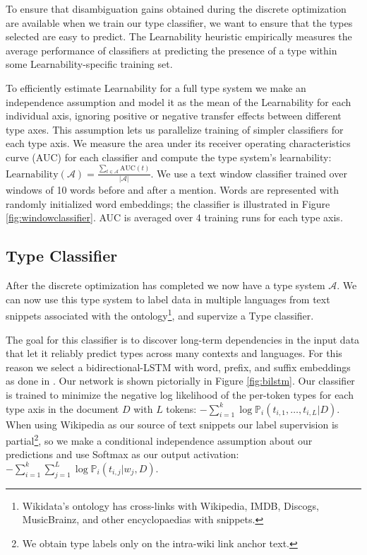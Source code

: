 \documentclass[letterpaper]{article}
\begin{document}
To ensure that disambiguation gains obtained during the discrete optimization are available when we train our type classifier, we want to ensure that the types selected are easy to predict. The Learnability heuristic empirically measures the average performance of classifiers at predicting the presence of a type within some Learnability-specific training set.

To efficiently estimate Learnability for a full type system we make an independence assumption and model it as the mean of the Learnability for each individual axis, ignoring positive or negative transfer effects between different type axes. This assumption lets us parallelize training of simpler classifiers for each type axis. We measure the area under its receiver operating characteristics curve (AUC) for each classifier and compute the type system's learnability: $\mathrm{Learnability}(\mathcal{A}) = \frac{\sum_{t \in \mathcal{A}}{\mathrm{AUC}(t)}}{|\mathcal{A}|}$.
We use a text window classifier trained over windows of 10 words before and after a mention. Words are represented with randomly initialized word embeddings; the classifier is illustrated in Figure \ref{fig:windowclassifier}. AUC is averaged over 4 training runs for each type axis.

\subsection{Type Classifier}
\label{section:typeclassifier}

After the discrete optimization has completed we now have a type system  $\mathcal{A}$. We can now use this type system to label data in multiple languages from text snippets associated with the ontology\footnote{Wikidata's ontology has cross-links with Wikipedia, IMDB, Discogs, MusicBrainz, and other encyclopaedias with snippets.}, and supervize a Type classifier.

The goal for this classifier is to discover long-term dependencies in the input data that let it reliably predict types across many contexts and languages. For this reason we select a bidirectional-LSTM \cite{lample2016neural} with word, prefix, and suffix embeddings as done in \cite{andor2016globally}. Our network is shown pictorially in Figure \ref{fig:bilstm}.
Our classifier is trained to minimize the negative log likelihood of the per-token types for each type axis in the document $D$ with $L$ tokens: $-\sum_{i=1}^k\log \mathbb P_i(t_{i,1}, \dots, t_{i,L}| D)$. When using Wikipedia as our source of text snippets our label supervision is partial\footnote{We obtain type labels only on the intra-wiki link anchor text.}, so we make a conditional independence assumption about our predictions and use Softmax as our output activation:
$-\sum_{i=1}^k\sum_{j=1}^L\log \mathbb P_i(t_{i,j}| w_j, D)$.
\end{document}
